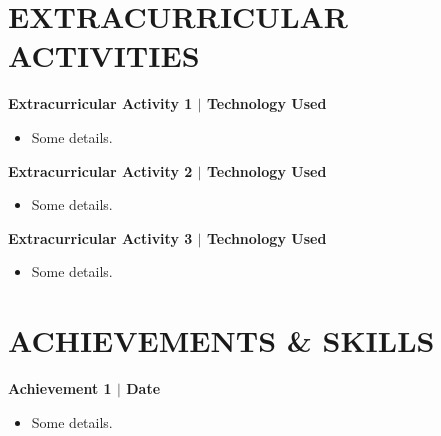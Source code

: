 \documentclass[10pt]{article}
\begin{document}
  \section*{\Large \textcolor{lighterB}{EXTRACURRICULAR ACTIVITIES}}
  \vspace*{-0.15cm}

  \textbf{\large {Extracurricular Activity 1} $\mid$ Technology Used} 
  \vspace*{-0.17cm}
  \begin{itemize}
    \itemsep0em
    \item \textcolor{lighterG}{Some details.}
  \end{itemize}

  \textbf{\large {Extracurricular Activity 2} $\mid$ Technology Used} 
  \vspace*{-0.17cm}
  \begin{itemize}
    \itemsep0em
    \item \textcolor{lighterG}{Some details.}
  \end{itemize}

  \textbf{\large {Extracurricular Activity 3} $\mid$ Technology Used} 
  \vspace*{-0.17cm}
  \begin{itemize}
    \itemsep0em
    \item \textcolor{lighterG}{Some details.}
  \end{itemize}


  \section*{\Large \textcolor{lighterB}{ACHIEVEMENTS \& SKILLS}}
  \vspace*{-0.1cm}  %
  \textbf{\large {Achievement 1} $\mid$ Date} 
  \vspace*{-0.17cm}
  \begin{itemize}
    \itemsep0em
    \item \textcolor{lighterG}{Some details.}
  \end{itemize}
\end{document}
